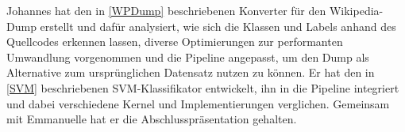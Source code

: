 Johannes hat den in \ref{WPDump} beschriebenen Konverter für den Wikipedia-Dump erstellt und dafür analysiert, wie sich die Klassen und Labels anhand des Quellcodes erkennen lassen, diverse Optimierungen zur performanten Umwandlung vorgenommen und die Pipeline angepasst, um den Dump als Alternative zum ursprünglichen Datensatz nutzen zu können. Er hat den in \ref{SVM} beschriebenen SVM-Klassifikator entwickelt, ihn in die Pipeline integriert und dabei verschiedene Kernel und Implementierungen verglichen. Gemeinsam mit Emmanuelle hat er die Abschlusspräsentation gehalten.
